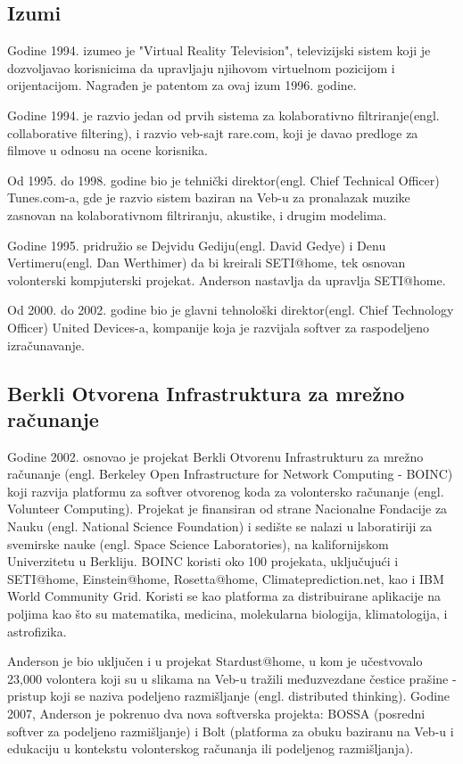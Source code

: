 \documentclass[titlepage, 12pt]{article}
\begin{document}
\subsection{Izumi}
Godine 1994. izumeo je "Virtual Reality Television", televizijski sistem koji je dozvoljavao korisnicima da upravljaju njihovom virtuelnom pozicijom i orijentacijom. Nagrađen je patentom za ovaj izum 1996. godine.

Godine 1994. je razvio jedan od prvih sistema za kolaborativno filtriranje(engl. collaborative filtering), i razvio veb-sajt rare.com, koji je davao predloge za filmove u odnosu na ocene korisnika.

Od 1995. do 1998. godine bio je tehnički direktor(engl. Chief Technical Officer) Tunes.com-a, gde je razvio sistem baziran na Veb-u za pronalazak muzike zasnovan na kolaborativnom filtriranju, akustike, i drugim modelima.

Godine 1995. pridružio se Dejvidu Gediju(engl. David Gedye) i Denu Vertimeru(engl. Dan Werthimer) da bi kreirali SETI@home, tek osnovan volonterski kompjuterski projekat. Anderson nastavlja da upravlja SETI@home.

Od 2000. do 2002. godine bio je glavni tehnološki direktor(engl. Chief Technology Officer) United Devices-a, kompanije koja je razvijala softver za raspodeljeno izračunavanje.

\subsection{Berkli Otvorena Infrastruktura za mrežno računanje}
Godine 2002. osnovao je projekat Berkli Otvorenu Infrastrukturu za mrežno računanje (engl. Berkeley Open Infrastructure for Network Computing - BOINC) koji razvija platformu za softver otvorenog koda za volontersko računanje (engl. Volunteer Computing). Projekat je finansiran od strane Nacionalne Fondacije za Nauku (engl. National Science Foundation) i sedište se nalazi u laboratiriji za svemirske nauke (engl. Space Science Laboratories), na kalifornijskom Univerzitetu u Berkliju. BOINC koristi oko 100 projekata, uključujući i SETI@home, Einstein@home, Rosetta@home, Climateprediction.net, kao i IBM World Community Grid. Koristi se kao platforma za distribuirane aplikacije na poljima kao što su matematika, medicina, molekularna biologija, klimatologija, i astrofizika.

Anderson je bio uključen i u projekat Stardust@home, u kom je učestvovalo 23,000 volontera koji su u slikama na Veb-u tražili međuzvezdane čestice prašine - pristup koji se naziva podeljeno razmišljanje (engl. distributed thinking). Godine 2007, Anderson je pokrenuo dva nova softverska projekta: BOSSA (posredni softver za podeljeno razmišljanje) i Bolt (platforma za obuku baziranu na Veb-u i edukaciju u kontekstu volonterskog računanja ili podeljenog razmišljanja).
\end{document}
